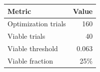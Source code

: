 \begin{tabular}{lr}
\toprule
Metric & Value \\
\midrule
Optimization trials & 160 \\
Viable trials & 40 \\
Viable threshold & 0.063 \\
Viable fraction & 25\% \\
\bottomrule
\end{tabular}